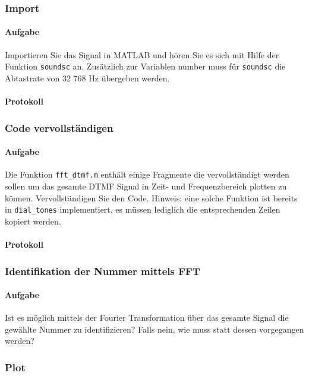 \documentclass[10pt]{report}
\begin{document}
        \subsubsection{Import}
        \paragraph{Aufgabe}
        Importieren Sie das Signal in MATLAB und hören Sie es sich mit Hilfe der Funktion
        \texttt{soundsc} an. Zusätzlich zur Variablen \glqq{}number\grqq{} muss für \texttt{soundsc} die Abtastrate
        von 32 768 Hz übergeben werden.

        \paragraph{Protokoll}

        \subsubsection{Code vervollständigen}
        \paragraph{Aufgabe}
        Die Funktion \texttt{fft\_dtmf.m} enthält einige Fragmente die vervollständigt werden sollen
        um das gesamte DTMF Signal in Zeit- und Frequenzbereich plotten zu können. Vervollständigen Sie den Code. Hinweis: eine solche Funktion ist bereits in
        \texttt{dial\_tones}
        implementiert, es müssen lediglich die entsprechenden Zeilen kopiert werden.
        \paragraph{Protokoll}

        \subsubsection{Identifikation der Nummer mittels FFT}
        \paragraph{Aufgabe}
        Ist es möglich mittels der Fourier Transformation über das gesamte Signal die
        gewählte Nummer zu identifizieren? Falls nein, wie muss statt dessen vorgegangen werden?


        \subsubsection{Plot}
\end{document}
